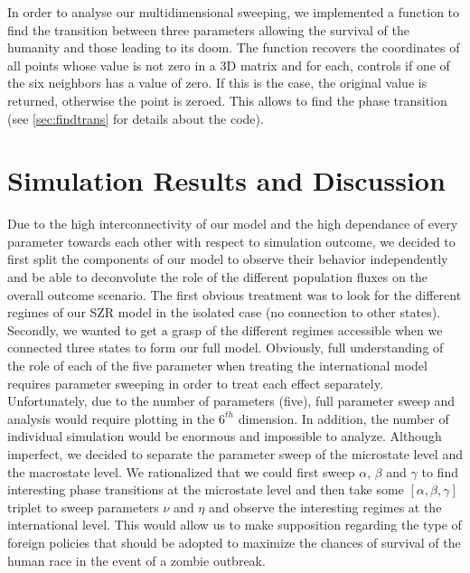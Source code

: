 \documentclass[11pt]{article} %
\begin{document}
In order to analyse our multidimensional sweeping, we implemented a function to find the transition between three parameters allowing the survival of the humanity and those leading to its doom. The function recovers the coordinates of all points whose value is not zero in a 3D matrix and for each, controls if one of the six neighbors has a value of zero. If this is the case, the original value is returned, otherwise the point is zeroed. This allows to find the phase transition (see \ref{sec:findtrans} for details about the code).





\newpage
\section{Simulation Results and Discussion}\indent

Due to the high interconnectivity of our model and the high dependance of every parameter towards each other with respect to simulation outcome, we decided to first split the components of our model to observe their behavior independently and be able to deconvolute the role of the different population fluxes on the overall outcome scenario. The first obvious treatment was to look for the different regimes of our SZR model in the isolated case (no connection to other states). Secondly, we wanted to get a grasp of the different regimes accessible when we connected three states to form our full model. Obviously, full understanding of the role of each of the five parameter when treating the international model requires parameter sweeping in order to treat each effect separately. Unfortunately, due to the number of parameters (five), full parameter sweep and analysis would require plotting in the $6^{th}$ dimension. In addition, the number of individual simulation would be enormous and impossible to analyze. Although imperfect, we decided to separate the parameter sweep of the microstate level and the macrostate level. We rationalized that we could first sweep $\alpha$, $\beta$ and $\gamma$  to find interesting phase transitions at the microstate level and then take some $[\alpha, \beta, \gamma]$ triplet to sweep parameters $\nu$ and $\eta$ and observe the interesting regimes at the international level. This would allow us to make supposition regarding the type of foreign policies that should be adopted to maximize the chances of survival of the human race in the event of a zombie outbreak. 
\end{document}
